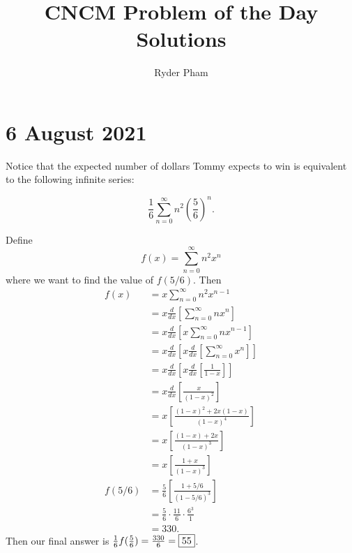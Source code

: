 \documentclass[letterpaper,oneside]{book}
\begin{document}
\title{CNCM Problem of the Day Solutions}
\author{Ryder Pham}
\maketitle

\section*{6 August 2021}

Notice that the expected number of dollars Tommy expects to win is equivalent to the following infinite series:

$$\frac16 \sum_{n=0}^\infty n^2\left(\frac56\right)^n.$$

Define 
$$f(x) = \sum_{n=0}^\infty n^2x^n$$
where we want to find the value of $f(5/6)$.
Then
\begin{align*}
    f(x) &= x\sum_{n=0}^\infty n^2x^{n-1}\\
    &= x\frac{d}{dx}\left[\sum_{n=0}^\infty nx^n\right] \\
    &= x\frac{d}{dx}\left[x\sum_{n=0}^\infty nx^{n-1}\right] \\
    &= x\frac{d}{dx}\left[x\frac{d}{dx}\left[\sum_{n=0}^\infty x^n\right]\right] \\
    &= x\frac{d}{dx}\left[x\frac{d}{dx}\left[\frac{1}{1-x}\right]\right] \\
    &= x\frac{d}{dx}\left[\frac{x}{(1-x)^2}\right] \\
    &= x\left[\frac{(1-x)^2+2x(1-x)}{(1-x)^4}\right] \\
    &= x\left[\frac{(1-x)+2x}{(1-x)^3}\right] \\
    &= x\left[\frac{1+x}{(1-x)^3}\right] \\
    f(5/6) &= \frac56 \left[\frac{1+5/6}{(1-5/6)^3}\right] \\
    &= \frac56 \cdot \frac{11}{6} \cdot \frac{6^3}{1} \\
    &= 330.
\end{align*}
Then our final answer is $\frac16 f(\frac56) = \frac{330}{6}= \fbox{55}$.
\end{document}
